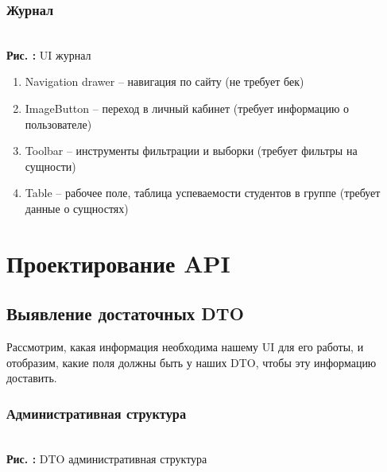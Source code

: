 \documentclass[12pt,a4paperб]{article}
\newcounter{picture}
\newcommand{\embedsvg}[3]{\begin{center}
		
		\\\textbf{Рис. \thepicture:} #3
		\label{pic_\thepicture}
		\addtocounter{picture}{1}
\end{center}}
\begin{document}
	 	 \subsubsection{Журнал}
	 
	 \embedsvg{plan.svg}{0.7}{UI журнал}
	 
	 \begin{enumerate}
	 	\item Navigation drawer -- навигация по сайту (не требует бек)
	 	\item ImageButton -- переход в личный кабинет (требует информацию о пользователе)
	 	\item Toolbar -- инструменты фильтрации и выборки (требует фильтры на сущности)
	 	\item Table -- рабочее поле, таблица успеваемости студентов в группе  (требует данные о сущностях)
	 \end{enumerate}
	 
	 \section{Проектирование API}
	 
	 \subsection{Выявление достаточных DTO}
	 
	 Рассмотрим, какая информация необходима нашему UI для его работы, и отобразим, какие поля должны быть у наших DTO, чтобы эту информацию доставить.
	 
	  \subsubsection{Административная структура}
	  
	 	 \embedsvg{admin_dto.svg}{0.7}{DTO административная структура} 
	 
\end{document}
